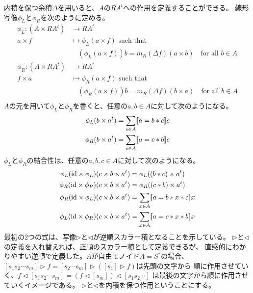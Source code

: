 		内積を保つ余積$\Delta$を用いると、$A$の$RA^t$への作用を定義することができる。
		線形写像$\phi_L$と$\phi_R$を次のように定める。
		\begin{equation}\label{eq:内積を保つ作用}\begin{split} %
			\phi_L: (A\times RA^t) &\to RA^t \\
				a\times f &\mapsto \phi_L(a\times f) \text{ such that} \\
				&\quad (\phi_L(a\times f))b=m_R(\Delta f)(a\times b)\quad\text{for all }b\in A \\
			\phi_R: (A\times RA^t) &\to RA^t \\
				f\times a &\mapsto \phi_R(a\times f) \text{ such that} \\
				&\quad (\phi_R(a\times f))b=m_R(\Delta f)(b\times a)\quad\text{for all }b\in A \\
		\end{split}\end{equation} %
		$A$の元を用いて$\phi_L$と$\phi_R$を書くと、任意の$a,b\in A$に対して次のようになる。
		\begin{equation}\begin{split} %
			\phi_L(b\times a^t) &= \sum_{c\in A}\jump{a=b*c}c \\
			\phi_R(b\times a^t) &= \sum_{c\in A}\jump{a=c*b}c \\
		\end{split}\end{equation} %
		$\phi_L$と$\phi_R$の結合性は、任意の$a,b,c\in A$に対して次のようになる。
		\begin{equation}\begin{split} %
			\phi_L(\myid\times \phi_L)(c\times b\times a^t) &= \phi_L((b*c)\times a^t) \\
			\phi_R(\myid\times \phi_R)(c\times b\times a^t) &= \phi_R((c*b)\times a^t) \\
			\phi_R(\myid\times \phi_L)(c\times b\times a^t) &= \sum_{x\in A}\jump{a=b*x*c}x \\
			\phi_L(\myid\times \phi_R)(c\times b\times a^t) &= \sum_{x\in A}\jump{a=c*x*b}x \\
		\end{split}\end{equation} %
		最初の2つの式は、写像$\rhd$と$\lhd$が逆順スカラー積となることを示している。
		$\rhd$と$\lhd$の定義を入れ替えれば、正順のスカラー積として定義できるが、
		直感的にわかりやすい逆順で定義した。$A$が自由モノイド$A=S^*$の場合、
		$[s_1s_2\cdots s_m]\rhd f=[s_2\cdots s_m]\rhd([s_1]\rhd f)$は先頭の文字から
		順に作用させていく、$f\lhd[s_1s_2\cdots s_m]=(f\lhd[s_m])\lhd[s_1s_2\cdots]$
		は最後の文字から順に作用させていくイメージである。
		$\rhd$と$\lhd$を内積を保つ作用ということにする。
		
